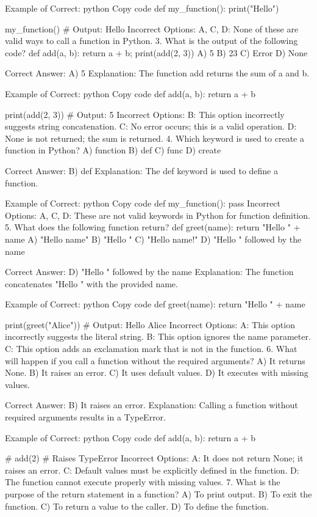 Example of Correct:
python
Copy code
def my_function():
    print("Hello")

my_function()  # Output: Hello
Incorrect Options:
A, C, D: None of these are valid ways to call a function in Python.
3. What is the output of the following code? def add(a, b): return a + b; print(add(2, 3))
A) 5
B) 23
C) Error
D) None

Correct Answer: A) 5
Explanation: The function add returns the sum of a and b.

Example of Correct:
python
Copy code
def add(a, b):
    return a + b

print(add(2, 3))  # Output: 5
Incorrect Options:
B: This option incorrectly suggests string concatenation.
C: No error occurs; this is a valid operation.
D: None is not returned; the sum is returned.
4. Which keyword is used to create a function in Python?
A) function
B) def
C) func
D) create

Correct Answer: B) def
Explanation: The def keyword is used to define a function.

Example of Correct:
python
Copy code
def my_function():
    pass
Incorrect Options:
A, C, D: These are not valid keywords in Python for function definition.
5. What does the following function return? def greet(name): return "Hello " + name
A) "Hello name"
B) "Hello "
C) "Hello name!"
D) "Hello " followed by the name

Correct Answer: D) "Hello " followed by the name
Explanation: The function concatenates "Hello " with the provided name.

Example of Correct:
python
Copy code
def greet(name):
    return "Hello " + name

print(greet("Alice"))  # Output: Hello Alice
Incorrect Options:
A: This option incorrectly suggests the literal string.
B: This option ignores the name parameter.
C: This option adds an exclamation mark that is not in the function.
6. What will happen if you call a function without the required arguments?
A) It returns None.
B) It raises an error.
C) It uses default values.
D) It executes with missing values.

Correct Answer: B) It raises an error.
Explanation: Calling a function without required arguments results in a TypeError.

Example of Correct:
python
Copy code
def add(a, b):
    return a + b

# add(2)  # Raises TypeError
Incorrect Options:
A: It does not return None; it raises an error.
C: Default values must be explicitly defined in the function.
D: The function cannot execute properly with missing values.
7. What is the purpose of the return statement in a function?
A) To print output.
B) To exit the function.
C) To return a value to the caller.
D) To define the function.

